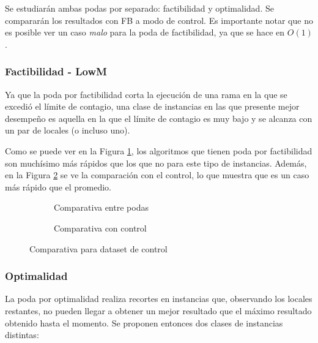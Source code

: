 Se estudiarán ambas podas por separado: factibilidad y optimalidad. Se compararán los resultados con FB a modo de control. Es importante notar que no es posible ver un caso \textit{malo} para la poda de factibilidad, ya que se hace en $O(1)$.

\subsubsection{Factibilidad - LowM}

Ya que la poda por factibilidad corta la ejecución de una rama en la que se excedió el límite de contagio, una clase de instancias en las que presente mejor desempeño es aquella en la que el límite de contagio es muy bajo y se alcanza con un par de locales (o incluso uno).

Como se puede ver en la Figura \ref{fig:low-m-comp}, los algoritmos que tienen poda por factibilidad son muchísimo más rápidos que los que no para este tipo de instancias. Además, en la Figura \ref{fig:low-m-control} se ve la comparación con el control, lo que muestra que es un caso más rápido que el promedio.

\begin{figure}[H]
    \centering
    \begin{subfigure}[b]{0.45\textwidth}
        \centering
        
        \caption{Comparativa entre podas}
        \label{fig:low-m-comp}
    \end{subfigure}
    \begin{subfigure}[b]{0.45\textwidth}
        \centering
        
        \caption{Comparativa con control}
        \label{fig:low-m-control}
    \end{subfigure}
    \caption{Comparativa para dataset de control}
    \label{fig:low-m}
\end{figure}



\subsubsection{Optimalidad}

La poda por optimalidad realiza recortes en instancias que, observando los locales restantes, no pueden llegar a obtener un mejor resultado que el máximo resultado obtenido hasta el momento. Se proponen entonces dos clases de instancias distintas:

